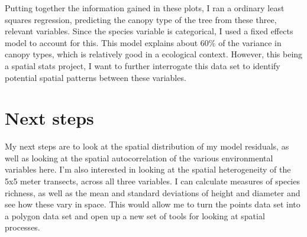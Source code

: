 \documentclass[11pt,a4paper]{article}
\begin{document}


Putting together the information gained in these plots, I ran a ordinary least squares regression, predicting the canopy type of the tree from these three, relevant variables.  Since the species variable is categorical, I used a fixed effects model to account for this.  This model explains about 60\% of the variance in canopy types, which is relatively good in a ecological context.  However, this being a spatial stats project, I want to further interrogate this data set to identify potential spatial patterns between these variables.

\section{Next steps}

My next steps are to look at the spatial distribution of my model residuals, as well as looking at the spatial autocorrelation of the various environmental variables here.  I'm also interested in looking at the spatial heterogeneity of the 5x5 meter transects, across all three variables.  I can calculate measures of species richness, as well as the mean and standard deviations of height and diameter and see how these vary in space.  This would allow me to turn the points data set into a polygon data set and open up a new set of tools for looking at spatial processes.


%
%
\end{document}
